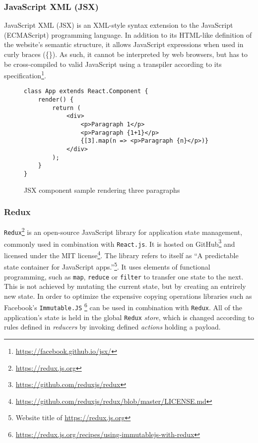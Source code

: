 \subsubsection{JavaScript XML (JSX)}
\label{subsub:basics-jsx}

JavaScript XML (JSX) is an XML-style syntax extension to the JavaScript (ECMAScript) programming language.
In addition to its HTML-like definition of the website's semantic structure, it allows JavaScript expressions when used in curly braces (\{\}).
As such, it cannot be interpreted by web browsers, but has to be cross-compiled to valid JavaScript using a transpiler according to its specification\footnote{\url{https://facebook.github.io/jsx/}}.


\begin{figure}[H]
\begin{verbatim}
class App extends React.Component {
    render() {
        return (
            <div>
                <p>Paragraph 1</p>
                <p>Paragraph {1+1}</p>
                {[3].map(n => <p>Paragraph {n}</p>)}
            </div>
        );
    }
}
\end{verbatim}
\caption{JSX component sample rendering three paragraphs}
\end{figure}


\subsubsection{Redux}
\label{subsub:basics-redux}

\texttt{Redux}\footnote{\url{https://redux.js.org}} is an open-source JavaScript library for application state management, commonly used in combination with \texttt{React.js}.
It is hosted on GitHub\footnote{\url{https://github.com/reduxjs/redux}} and licensed under the MIT license\footnote{\url{https://github.com/reduxjs/redux/blob/master/LICENSE.md}}.
The library refers to itself as ``A predictable state container for JavaScript apps.''\footnote{Website title of \url{https://redux.js.org}}. It uses elements of functional programming, such as \texttt{map}, \texttt{reduce} or \texttt{filter} to transfer one state to the next. This is not achieved by mutating the current state, but by creating an entrirely new state. In order to optimize the expensive copying operations libraries such as Facebook's \texttt{Immutable.JS} \footnote{\url{https://redux.js.org/recipes/using-immutablejs-with-redux}} can be used in combination with \texttt{Redux}. All of the application's state is held in the global \texttt{Redux} \textit{store}, which is changed according to rules defined in \textit{reducers} by invoking defined \textit{actions} holding a payload.